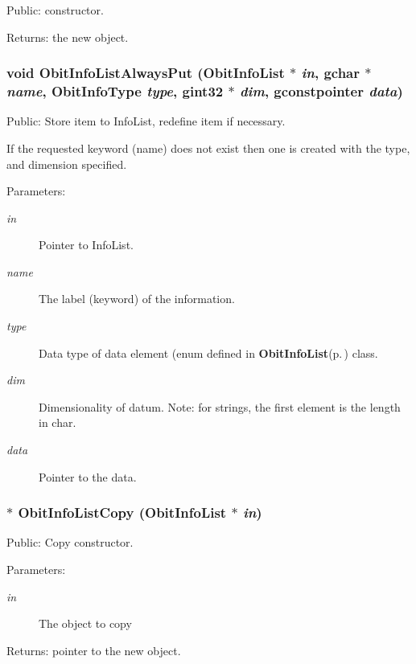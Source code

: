 Public: constructor. 

\begin{Desc}
\item[Returns:]the new object. \end{Desc}
\subsubsection{\setlength{\rightskip}{0pt plus 5cm}void Obit\-Info\-List\-Always\-Put ({\bf Obit\-Info\-List} $\ast$ {\em in}, gchar $\ast$ {\em name}, Obit\-Info\-Type {\em type}, gint32 $\ast$ {\em dim}, gconstpointer {\em data})}\label{ObitInfoList_8h_a11}


Public: Store item to Info\-List, redefine item if necessary. 

If the requested keyword (name) does not exist then one is created with the type, and dimension specified. \begin{Desc}
\item[Parameters:]
\begin{description}
\item[{\em in}]Pointer to Info\-List. \item[{\em name}]The label (keyword) of the information. \item[{\em type}]Data type of data element (enum defined in {\bf Obit\-Info\-List}{\rm (p.\,\pageref{structObitInfoList})} class. \item[{\em dim}]Dimensionality of datum. Note: for strings, the first element is the length in char. \item[{\em data}]Pointer to the data. \end{description}
\end{Desc}
\subsubsection{$\ast$ Obit\-Info\-List\-Copy ({\bf Obit\-Info\-List} $\ast$ {\em in})}\label{ObitInfoList_8h_a2}


Public: Copy constructor. 

\begin{Desc}
\item[Parameters:]
\begin{description}
\item[{\em in}]The object to copy \end{description}
\end{Desc}
\begin{Desc}
\item[Returns:]pointer to the new object. \end{Desc}
